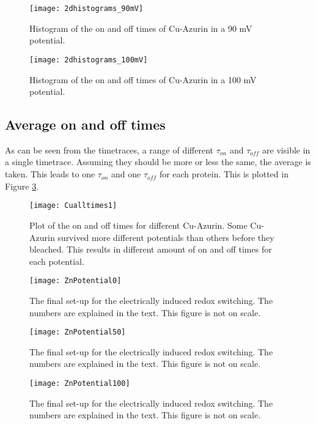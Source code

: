 \documentclass[twoside,single]{lion-msc}
\begin{document}
\begin{figure}
\centering
\texttt{[image: 2dhistograms\_90mV]}
\caption{Histogram of the on and off times of Cu-Azurin in a 90 mV potential.}
\label{2dhistograms_0mV}
\end{figure}

\begin{figure}
\centering
\texttt{[image: 2dhistograms\_100mV]}
\caption{Histogram of the on and off times of Cu-Azurin in a 100 mV potential.}
\label{2dhistograms_100mV}
\end{figure}

\subsection{Average on and off times}
As can be seen from the timetraces, a range of different $\tau_{on}$ and $\tau_{off}$ are visible in a single timetrace. Assuming they should be more or less the same, the average is taken. This leads to one  $\tau_{on}$ and one $\tau_{off}$ for each protein. This is plotted in Figure \ref{Cu_all_times}. 

\begin{figure}
\centering
\texttt{[image: Cualltimes1]}
\caption{Plot of the on and off times for different Cu-Azurin. Some Cu-Azurin survived more different potentials than others before they bleached. This results in different amount of on and off times for each potential. }
\label{Cu_all_times}
\end{figure}



\begin{figure}
\centering
\texttt{[image: ZnPotential0]}
\caption{The final set-up for the electrically induced redox switching. The numbers are explained in the text. This figure is not on scale.}
\label{final_setup}
\end{figure}

\begin{figure}
\centering
\texttt{[image: ZnPotential50]}
\caption{The final set-up for the electrically induced redox switching. The numbers are explained in the text. This figure is not on scale.}
\label{final_setup}
\end{figure}

\begin{figure}[ht!]
\centering
\texttt{[image: ZnPotential100]}
\caption{The final set-up for the electrically induced redox switching. The numbers are explained in the text. This figure is not on scale.}
\label{final_setup}
\end{figure}
\end{document}
